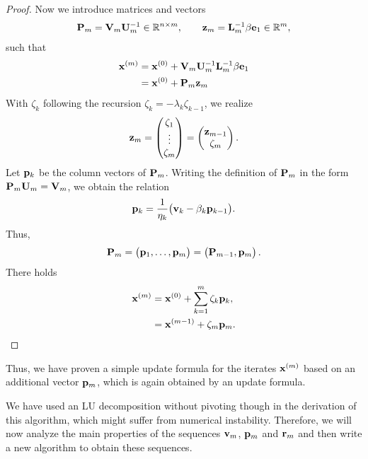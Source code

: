 \begin{proof}
  Now we introduce matrices and vectors
  \begin{gather}
    \mathbf P_m = \mathbf V_m \mathbf U_m^{-1} \in \mathbb R^{n\times m},
    \qquad \mathbf z_m = \mathbf L_m^{-1} \beta \mathbf e_1\in \mathbb R^m,
  \end{gather}
  such that
  \begin{align}
    \mathbf x^{(m)}
    &= \mathbf x^{(0)} + \mathbf V_m \mathbf U_m^{-1} \mathbf L_m^{-1} \beta \mathbf e_1\\
    &= \mathbf x^{(0)} + \mathbf P_m \mathbf z_m
  \end{align}
  With $\zeta_k$ following the recursion
  $\zeta_k = - \lambda_k \zeta_{k-1}$, we realize
  \begin{gather}
    \mathbf z_m =
    \begin{pmatrix}
      \zeta_1\\\vdots\\\zeta_m
    \end{pmatrix}
    =
    \begin{pmatrix}
      \mathbf z_{m-1}\\\zeta_m
    \end{pmatrix}.
  \end{gather}
  Let $\mathbf p_k$ be the column vectors of $\mathbf P_m$. Writing the
  definition of $\mathbf P_m$ in the form $\mathbf P_m \mathbf U_m = \mathbf V_m$, we
  obtain the relation
  \begin{gather}
    \label{eq:nla:krylov:lanczos-p}
    \mathbf p_k = \frac1{\eta_k}\bigl(\mathbf v_k - \beta_k \mathbf p_{k-1}\bigr).
  \end{gather}
  Thus,
  \begin{gather}
    \mathbf P_m =
    \begin{pmatrix}
      \mathbf p_1,\dots,\mathbf p_m
    \end{pmatrix}
    =
    \begin{pmatrix}
      \mathbf P_{m-1},\mathbf p_m
    \end{pmatrix}.
  \end{gather}
  There holds
  \begin{align}
    \mathbf x^{(m)}
    &= \mathbf x^{(0)} + \sum_{k=1}^m \zeta_k \mathbf p_k,\\
    &= \mathbf x^{(m-1)} + \zeta_m \mathbf p_m.
  \end{align}
\end{proof}

\begin{remark}
  Thus, we have proven a simple update formula for the iterates
  $\mathbf x^{(m)}$ based on an additional vector $\mathbf p_m$, which is again
  obtained by an update formula.

  We have used an LU decomposition without pivoting though in the
  derivation of this algorithm, which might suffer from numerical
  instability. Therefore, we will now analyze the main properties of
  the sequences $\mathbf v_m$, $\mathbf p_m$ and $\mathbf r_m$ and then write a new
  algorithm to obtain these sequences.
\end{remark}


